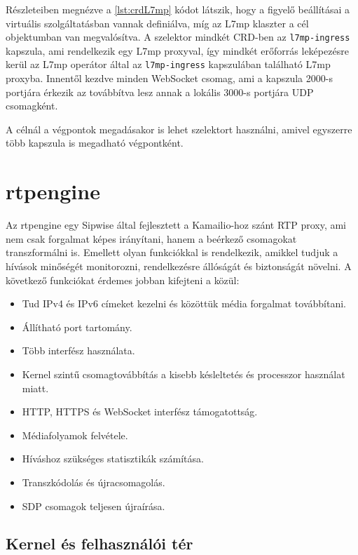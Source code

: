 Részleteiben megnézve a \ref{lst:crdL7mp} kódot látszik, hogy a figyelő beállításai a 
virtuális szolgáltatásban vannak definiálva, míg az L7mp klaszter a cél objektumban van
megvalósítva. A szelektor mindkét CRD-ben az \texttt{l7mp-ingress} kapszula, ami 
rendelkezik egy L7mp proxyval, így mindkét erőforrás leképezésre kerül az L7mp operátor 
által az \texttt{l7mp-ingress} kapszulában található L7mp proxyba. Innentől kezdve minden 
WebSocket csomag, ami a kapszula 2000-s portjára érkezik az továbbítva lesz annak a 
lokális 3000-s portjára UDP csomagként. 

A célnál a végpontok megadásakor is lehet szelektort használni, amivel egyszerre több
kapszula is megadható végpontként. 

\section{rtpengine}

Az rtpengine egy Sipwise  által fejlesztett a Kamailio-hoz szánt RTP proxy, ami nem csak 
forgalmat képes irányítani, hanem a beérkező csomagokat transzformálni is. Emellett olyan 
funkciókkal is rendelkezik, amikkel tudjuk a hívások minőségét monitorozni, rendelkezésre 
állóságát és biztonságát növelni. A következő funkciókat érdemes jobban kifejteni a 
\cite{rtpengine} közül: 

\begin{itemize}
	\item Tud IPv4 és IPv6 címeket kezelni és közöttük média forgalmat továbbítani. 
	\item Állítható port tartomány. 
	\item Több interfész használata. 
	\item Kernel szintű csomagtovábbítás a kisebb késleltetés és processzor használat 
	miatt.
	\item HTTP, HTTPS és WebSocket interfész támogatottság.
	\item Médiafolyamok felvétele. 
	\item Híváshoz szükséges statisztikák számítása.
	\item Transzkódolás és újracsomagolás.
	\item SDP csomagok teljesen újraírása. 
\end{itemize}

\subsection{Kernel és felhasználói tér}

